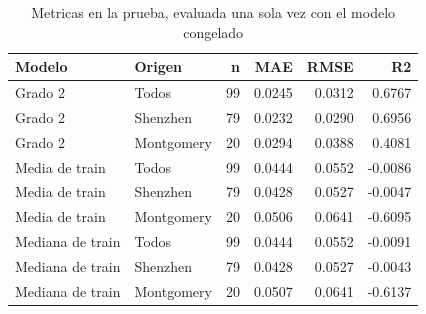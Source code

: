 \begin{table}[H]
\centering
\small
\caption{Metricas en la prueba, evaluada una sola vez con el modelo congelado}
\begin{tabular}{llrrrr}
\toprule
\textbf{Modelo} & \textbf{Origen} & \textbf{n} & \textbf{MAE} & \textbf{RMSE} & \textbf{R2} \\
\midrule
Grado 2 & Todos & 99 & 0.0245 & 0.0312 & 0.6767 \\
Grado 2 & Shenzhen & 79 & 0.0232 & 0.0290 & 0.6956 \\
Grado 2 & Montgomery & 20 & 0.0294 & 0.0388 & 0.4081 \\
Media de train & Todos & 99 & 0.0444 & 0.0552 & -0.0086 \\
Media de train & Shenzhen & 79 & 0.0428 & 0.0527 & -0.0047 \\
Media de train & Montgomery & 20 & 0.0506 & 0.0641 & -0.6095 \\
Mediana de train & Todos & 99 & 0.0444 & 0.0552 & -0.0091 \\
Mediana de train & Shenzhen & 79 & 0.0428 & 0.0527 & -0.0043 \\
Mediana de train & Montgomery & 20 & 0.0507 & 0.0641 & -0.6137 \\
\bottomrule
\end{tabular}
\end{table}
